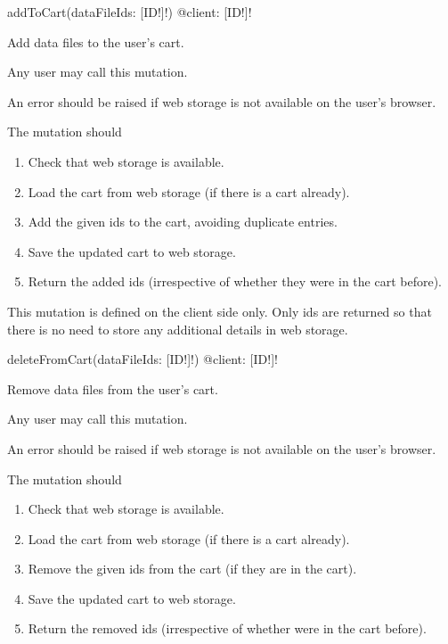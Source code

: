 
\begin{code}
addToCart(dataFileIds: [ID!]!) @client: [ID!]!
\end{code}

Add data files to the user's cart.

\restrictions

Any user may call this mutation.

\errors

An error should be raised if web storage is not available on the user's browser.

\functionality

The mutation should

\begin{enumerate}
    \item Check that web storage is available.
    \item Load the cart from web storage (if there is a cart already).
    \item Add the given ids to the cart, avoiding duplicate entries.
    \item Save the updated cart to web storage.
    \item Return the added ids (irrespective of whether they were in the cart before).
\end{enumerate}

\begin{note}
This mutation is defined on the client side only. Only ids are returned so that there is no need to store any additional details in web storage.
\end{note}


\begin{code}
deleteFromCart(dataFileIds: [ID!]!) @client: [ID!]!
\end{code}

Remove data files from the user's cart.

\restrictions

Any user may call this mutation.

\errors

An error should be raised if web storage is not available on the user's browser.

\functionality

The mutation should

\begin{enumerate}
    \item Check that web storage is available.
    \item Load the cart from web storage (if there is a cart already).
    \item Remove the given ids from the cart (if they are in the cart).
    \item Save the updated cart to web storage.
    \item Return the removed ids (irrespective of whether were in the cart before).
\end{enumerate}

